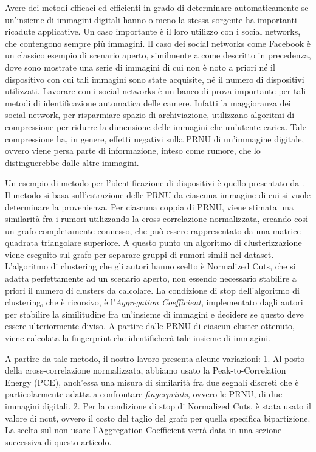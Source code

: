 Avere dei metodi efficaci ed efficienti in grado di determinare automaticamente se un'insieme di immagini digitali hanno o meno la stessa sorgente ha importanti ricadute applicative. Un caso importante è il loro utilizzo con i social networks, che contengono sempre più immagini. Il caso dei social networks come Facebook è un classico esempio di scenario aperto, similmente a come descritto in precedenza, dove sono mostrate una serie di immagini di cui non è noto a priori né il dispositivo con cui tali immagini sono state acquisite, né il numero di dispositivi utilizzati. Lavorare con i social networks è un banco di prova importante per tali metodi di identificazione automatica delle camere. Infatti la maggioranza dei social network, per risparmiare spazio di archiviazione, utilizzano algoritmi di compressione per ridurre la dimensione delle immagini che un'utente carica. Tale compressione ha, in genere, effetti negativi sulla PRNU di un'immagine digitale, ovvero viene persa parte di informazione, inteso come rumore, che lo distinguerebbe dalle altre immagini.

Un esempio di metodo per l'identificazione di dispositivi è quello presentato da \cite{Amerini2014831}. Il metodo si basa sull'estrazione delle PRNU da ciascuna immagine di cui si vuole determinare la provenienza. Per ciascuna coppia di PRNU, viene stimata una similarità fra i rumori utilizzando la cross-correlazione normalizzata, creando così un grafo completamente connesso, che può essere rappresentato da una matrice quadrata triangolare superiore. A questo punto un algoritmo di clusterizzazione viene eseguito sul grafo per separare gruppi di rumori simili nel dataset. L'algoritmo di clustering che gli autori hanno scelto è Normalized Cuts, che si adatta perfettamente ad un scenario aperto, non essendo necessario stabilire a priori il numero di clusters da calcolare. La condizione di stop dell'algoritmo di clustering, che è ricorsivo, è l'\emph{Aggregation Coefficient}, implementato dagli autori per stabilire la similitudine fra un'insieme di immagini e decidere se questo deve essere ulteriormente diviso. A partire dalle PRNU di ciascun cluster ottenuto, viene calcolata la fingerprint che identificherà tale insieme di immagini.

A partire da tale metodo, il nostro lavoro presenta alcune variazioni:
1. Al posto della cross-correlazione normalizzata, abbiamo usato la Peak-to-Correlation Energy (PCE), anch'essa una misura di similarità fra due segnali discreti che è particolarmente adatta a confrontare \emph{fingerprints}, ovvero le PRNU, di due immagini digitali.
2. Per la condizione di stop di Normalized Cuts, è stata usato il valore di ncut, ovvero il costo del taglio del grafo per quella specifica bipartizione. La scelta sul non usare l'Aggregation Coefficient verrà data in una sezione successiva di questo articolo.

